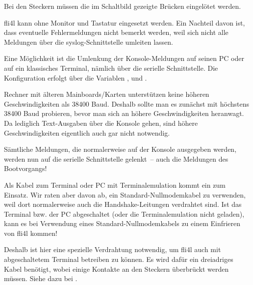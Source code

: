     Bei den Steckern müssen die im Schaltbild gezeigte Brücken 
    eingelötet werden.



    fli4l kann ohne Monitor und Tastatur eingesetzt werden. Ein Nachteil 
    davon ist, dass eventuelle Fehlermeldungen nicht bemerkt werden, weil 
    sich nicht alle Meldungen über die syslog-Schnittstelle umleiten lassen.

    Eine Möglichkeit ist die Umlenkung der Konsole-Meldungen auf seinen PC 
    oder auf ein klassisches Terminal, nämlich über die serielle 
    Schnittstelle. Die Konfiguration erfolgt über die Variablen
    ,
     und
    .

    Rechner mit älteren Mainboards/Karten unterstützen keine höheren 
    Geschwindigkeiten als 38400 Baud. Deshalb sollte man es zunächst mit 
    höchstens 38400 Baud probieren, bevor man sich an höhere Geschwindigkeiten 
    heranwagt. Da lediglich Text-Ausgaben über die Konsole gehen, sind höhere 
    Geschwindigkeiten eigentlich auch gar nicht notwendig.

    Sämtliche Meldungen, die normalerweise auf der Konsole ausgegeben werden, 
    werden nun auf die serielle Schnittstelle gelenkt~-- auch die Meldungen 
    des Bootvorgangs!

    Als Kabel zum Terminal oder PC mit Terminalemulation kommt ein 
     zum Einsatz. Wir raten aber davon ab,
    ein Standard-Nullmodemkabel zu verwenden, weil dort normalerweise auch
    die Handshake-Leitungen verdrahtet sind. Ist das Terminal bzw. der PC
    abgeschaltet (oder die Terminalemulation nicht geladen), kann es bei
    Verwendung eines Standard-Nullmodemkabels zu einem Einfrieren von fli4l
    kommen!

    Deshalb ist hier eine spezielle Verdrahtung notwendig, um fli4l auch mit 
    abgeschaltetem Terminal betreiben zu können. Es wird dafür ein dreiadriges 
    Kabel benötigt, wobei einige Kontakte an den Steckern überbrückt werden 
    müssen. Siehe dazu bei .


